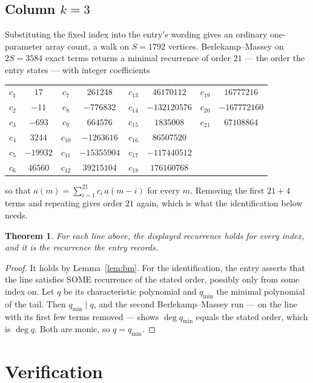 \documentclass[11pt,a4paper]{article}
\theoremstyle{plain}
\newtheorem{theorem}{Theorem}
\theoremstyle{definition}
\begin{document}
\subsection*{Column $k=3$}
Substituting the fixed index into the entry's wording gives an ordinary one-parameter array
count, a walk on $S=1792$ vertices. Berlekamp--Massey on $2S=3584$ exact terms
returns a minimal recurrence of order $21$ --- the order the entry states --- with
integer coefficients
\begin{center}\small\begin{tabular}{cccccccc}
$c_{1}$ & $17$ & $c_{7}$ & $261248$ & $c_{13}$ & $46170112$ & $c_{19}$ & $16777216$ \\
$c_{2}$ & $-11$ & $c_{8}$ & $-776832$ & $c_{14}$ & $-132120576$ & $c_{20}$ & $-167772160$ \\
$c_{3}$ & $-693$ & $c_{9}$ & $664576$ & $c_{15}$ & $1835008$ & $c_{21}$ & $67108864$ \\
$c_{4}$ & $3244$ & $c_{10}$ & $-1263616$ & $c_{16}$ & $86507520$ &  &  \\
$c_{5}$ & $-19932$ & $c_{11}$ & $-15355904$ & $c_{17}$ & $-117440512$ &  &  \\
$c_{6}$ & $46560$ & $c_{12}$ & $39215104$ & $c_{18}$ & $176160768$ &  &  \\
\end{tabular}\end{center}
so that $a(m)=\sum_{i=1}^{21}c_i\,a(m-i)$ for every $m$. Removing the first
$21+4$ terms and repeating gives order $21$ again, which is what the
identification below needs.

\begin{theorem}
For each line above, the displayed recurrence holds for every index, and it is the recurrence
the entry records.
\end{theorem}

\begin{proof}
It holds by Lemma~\ref{lem:bm}. For the identification, the entry asserts that the line
satisfies SOME recurrence of the stated order, possibly only from some index on. Let $q$ be its
characteristic polynomial and $q_{\min}$ the minimal polynomial of the tail. Then
$q_{\min}\mid q$, and the second Berlekamp--Massey run --- on the line with its first few
terms removed --- shows $\deg q_{\min}$ equals the stated order, which is $\deg q$. Both are
monic, so $q=q_{\min}$.
\end{proof}

\section{Verification}
\end{document}
